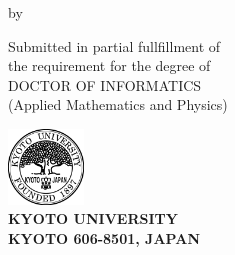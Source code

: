 \documentclass[../main]{subfiles}
\begin{document}
\begin{titlepage}

    \centering
    \vspace*{1cm}

    \Large

    \textbf{ \uppercase\expandafter{\TheTitle}}

    {\large \textbf{\TheSubTitle}}

    \vspace{2cm}

    by

    \vspace{3mm}

    \textbf{\uppercase\expandafter{\TheAuthor}}

    \vspace{2cm}

    {\large
        Submitted in partial fullfillment of \\
        the requirement for the degree of \\
        DOCTOR OF INFORMATICS \\
        (Applied Mathematics and Physics)
    }

    \vspace{2cm}

    \includegraphics[width=2cm]{figs/logo}\\

    \textbf{
        KYOTO UNIVERSITY \\ \vspace{1mm}
        KYOTO 606-8501, JAPAN \\ \vspace{1mm}
        \uppercase\expandafter{\TheDate}
    }

\end{titlepage}
\end{document}
